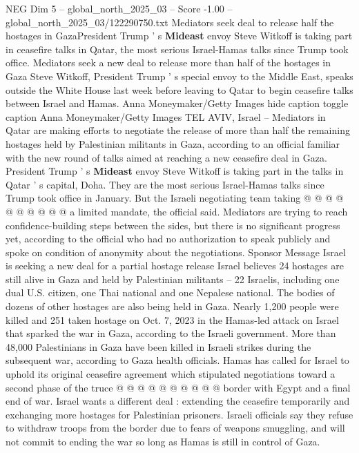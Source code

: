 \begin{textsample}{NEG Dim 5 – global\_north\_2025\_03 – Score -1.00 – global\_north\_2025\_03/122290750.txt}  \label{ex:f5_neg_256}
Mediators seek deal to release half the hostages in GazaPresident Trump ' s \textbf{Mideast} envoy Steve Witkoff is taking part in ceasefire talks in Qatar, the most serious Israel-Hamas talks since Trump took office.
Mediators seek a new deal to release more than half of the hostages in Gaza Steve Witkoff, President Trump ' s special envoy to the Middle East, speaks outside the White House last week before leaving to Qatar to begin ceasefire talks between Israel and Hamas.
Anna Moneymaker/Getty Images hide caption toggle caption Anna Moneymaker/Getty Images TEL AVIV, Israel -- Mediators in Qatar are making efforts to negotiate the release of more than half the remaining hostages held by Palestinian militants in Gaza, according to an official familiar with the new round of talks aimed at reaching a new ceasefire deal in Gaza.
President Trump ' s \textbf{Mideast} envoy Steve Witkoff is taking part in the talks in Qatar ' s capital, Doha.
They are the most serious Israel-Hamas talks since Trump took office in January.
But the Israeli negotiating team taking @ @ @ @ @ @ @ @ @ @ a limited mandate, the official said.
Mediators are trying to reach confidence-building steps between the sides, but there is no significant progress yet, according to the official who had no authorization to speak publicly and spoke on condition of anonymity about the negotiations.
Sponsor Message Israel is seeking a new deal for a partial hostage release Israel believes 24 hostages are still alive in Gaza and held by Palestinian militants -- 22 Israelis, including one dual U.S. citizen, one Thai national and one Nepalese national.
The bodies of dozens of other hostages are also being held in Gaza.
Nearly 1,200 people were killed and 251 taken hostage on Oct. 7, 2023 in the Hamas-led attack on Israel that sparked the war in Gaza, according to the Israeli government.
More than 48,000 Palestinians in Gaza have been killed in Israeli strikes during the subsequent war, according to Gaza health officials.
Hamas has called for Israel to uphold its original ceasefire agreement which stipulated negotiations toward a second phase of the truce @ @ @ @ @ @ @ @ @ @ border with Egypt and a final end of war.
Israel wants a different deal : extending the ceasefire temporarily and exchanging more hostages for Palestinian prisoners.
Israeli officials say they refuse to withdraw troops from the border due to fears of weapons smuggling, and will not commit to ending the war so long as Hamas is still in control of Gaza.

\end{textsample}

